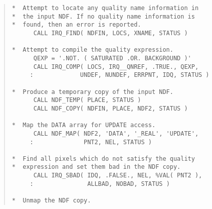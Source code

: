 \begin{quote}
\begin{tabbing} 

\verb#*  Attempt to locate any quality name information in   #\\
\verb#*  the input NDF. If no quality name information is    #\\
\verb#*  found, then an error is reported.                   #\\
\verb#      CALL IRQ_FIND( NDFIN, LOCS, XNAME, STATUS )      #\\
\verb#                                                       #\\
\verb#*  Attempt to compile the quality expression.          #\\
\verb#      QEXP = '.NOT. ( SATURATED .OR. BACKGROUND )'     #\\
\verb#      CALL IRQ_COMP( LOCS, IRQ__QNREF, .TRUE., QEXP,   #\\
\verb#     :             UNDEF, NUNDEF, ERRPNT, IDQ, STATUS )#\\
\verb#                                                       #\\
\verb#*  Produce a temporary copy of the input NDF.          #\\
\verb#      CALL NDF_TEMP( PLACE, STATUS )                   #\\
\verb#      CALL NDF_COPY( NDFIN, PLACE, NDF2, STATUS )      #\\
\verb#                                                       #\\
\verb#*  Map the DATA array for UPDATE access.               #\\
\verb#      CALL NDF_MAP( NDF2, 'DATA', '_REAL', 'UPDATE',   #\\
\verb#     :              PNT2, NEL, STATUS )                #\\
\verb#                                                       #\\
\verb#*  Find all pixels which do not satisfy the quality    #\\
\verb#*  expression and set them bad in the NDF copy.        #\\
\verb#      CALL IRQ_SBAD( IDQ, .FALSE., NEL, %VAL( PNT2 ),  #\\
\verb#     :               ALLBAD, NOBAD, STATUS )           #\\
\verb#                                                       #\\
\verb#*  Unmap the NDF copy.                                 #\\

\end{tabbing}
\end{quote}
